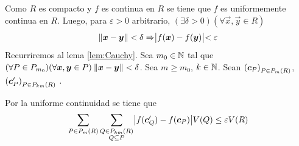 %
%

\begin{demostracion}
Como $ R $ es compacto y $ f $ es continua en $ R $ se tiene que $ f $ es uniformemente continua en $ R $. Luego, para $ \varepsilon > 0 $ arbitrario,  $ (\exists \delta >0)(\forall \vec{x},\vec{y} \in R)$
\[ \lVert\boldsymbol{x}-\boldsymbol{y}\rVert < \delta \Rightarrow \bigr\lvert f(\boldsymbol{x}) - f(\boldsymbol{y})\bigl\rvert < \varepsilon\]
Recurriremos al lema \ref{lem:Cauchy}. Sea $m_0\in \mathbb{N}$ tal que $ (\forall P \in P_{m_0})(\forall \boldsymbol{x},\boldsymbol{y} \in P) \: \lVert\boldsymbol{x}-\boldsymbol{y}\rVert < \delta $. 
Sea $ m \geq m_0 $, $k\in \mathbb{N}$. Sean ${(\boldsymbol{c}_P)}_{P \in P_{m}(R)}$, $ {(\boldsymbol{c}'_P)}_{P \in P_{km}(R)} $ \familiasEleccion{}.

Por la uniforme continuidad se tiene que
\[ \sum_{P \in P_{m}(R)} \sum_{\substack{Q \in P_{km}(R) \\ Q \subseteq P}} \bigr\lvert f(\boldsymbol{c}'_Q)-f(\boldsymbol{c}_P) \bigl\rvert V(Q) \leq \varepsilon V(R)\]
\end{demostracion}

